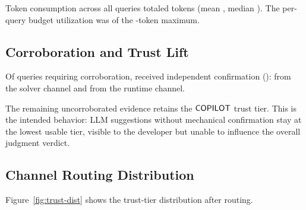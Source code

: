 \documentclass[11pt]{article}
\begin{document}
Token consumption across all queries totaled
\ppLXXXVIIItotalTokens{} tokens (mean \ppLXXXVIIImeanTokens{},
median \ppLXXXVIIImedianTokens{}).  The per-query budget
utilization was \ppLXXXVIIItokenBudgetPct{} of the
\ppLXXXVIIImaxTokensPerQuery-token maximum.

\subsection{Corroboration and Trust Lift}
\label{sec:exp:corrob}

Of \ppLXXXVIIIcorrobRequired{} queries requiring corroboration,
\ppLXXXVIIIcorrobObtained{} received independent confirmation
(\ppLXXXVIIIcorrobRate{}):
\ppLXXXVIIIcorrobBySolver{} from the solver channel and
\ppLXXXVIIIcorrobByRuntime{} from the runtime channel.

The remaining uncorroborated evidence retains the
$\mathsf{COPILOT}$ trust tier.  This is the intended behavior:
LLM suggestions without mechanical confirmation stay at the
lowest usable tier, visible to the developer but unable to
influence the overall judgment verdict.

\subsection{Channel Routing Distribution}
\label{sec:exp:routing}

Figure~\ref{fig:trust-dist} shows the trust-tier distribution
after routing.
\end{document}
